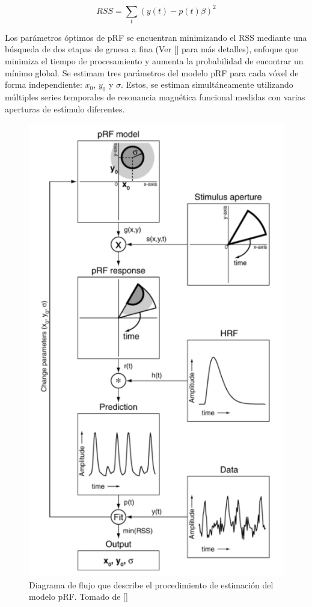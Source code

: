 \begin{equation}
	RSS = \sum_{t}(y(t)-p(t)\beta)^2
\end{equation}

Los parámetros óptimos de pRF se encuentran minimizando el RSS mediante una búsqueda de dos etapas de gruesa a fina (Ver [\cite{dumoulin_population_2008}] para m\'as detalles), enfoque que minimiza el tiempo de procesamiento y aumenta la probabilidad de encontrar un mínimo global. Se estimam tres parámetros del modelo pRF para cada vóxel de forma independiente: $x_0$, $y_0$ y $\sigma$. Estos, se estiman simultáneamente utilizando múltiples series temporales de resonancia magnética funcional medidas con varias aperturas de estímulo diferentes.

\begin{figure}
\centering
\includegraphics[scale=0.6]{../images/pRF model}
\caption{Diagrama de flujo que describe el procedimiento de estimación del modelo pRF. Tomado de [\cite{dumoulin_population_2008}]}
\label{fig:pRF}
\end{figure}

